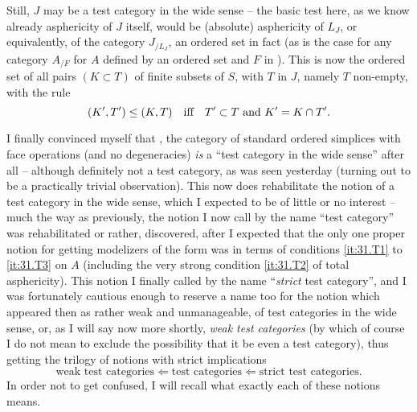 Still, $J$ may be a test category in the wide sense -- the basic test
here, as we know already asphericity of $J$ itself, would be
(absolute) asphericity of $L_J$, or equivalently, of the category
$J_{/L_J}$, an ordered set in fact (as is the case for any category
$A_{/F}$ for $A$ defined by an ordered set and $F$ in \Ahat). This is
now the ordered set of all pairs $(K\subset T)$ of finite subsets of
$S$, with $T$ in $J$, namely $T$ non-empty, with the rule
\[ (K',T') \le (K,T) \quad\text{if{f}}\quad \text{$T'\subset T$ and
  $K'=K\mathbin{\cap} T'$.}\]

\bigbreak

\noindent\hfill{}\par

\label{sec:44}%
\renewcommand*{\thesubsection}{\alph{subsection})}%
I finally convinced myself that \Simplexf, the category of standard
ordered simplices with face operations (and no degeneracies) \emph{is}
a ``test category in the wide sense'' after all -- although definitely
not a test category, as was seen yesterday (turning out to be a
practically trivial observation). This now does rehabilitate the
notion of a test category in the wide sense, which I expected to be of
little or no interest -- much the way as previously, the notion I now
call by the name ``test category'' was rehabilitated or rather,
discovered, after I expected that the only one proper notion for
getting modelizers of the form \Ahat{} was in terms of conditions
\ref{it:31.T1} to \ref{it:31.T3} on $A$ (including the very strong
condition \ref{it:31.T2} of total asphericity). This notion I finally
called by the name ``\emph{strict} test category'', and I was
fortunately cautious enough to reserve a name too for the notion which
appeared then as rather weak and unmanageable, of test categories in
the wide sense, or, as I will say now more shortly, \emph{weak test
  categories} (by which of course I do not mean to exclude the
possibility that it be even a test category), thus getting the trilogy
of notions with strict implications
\[\text{weak test categories} \Leftarrow \text{test categories}
\Leftarrow \text{strict test categories}.\]
In order not to get confused, I will recall what exactly each of these
notions means.

